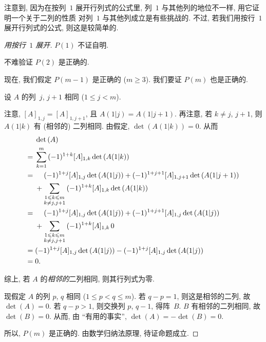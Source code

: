 注意到, 因为在按列~\(1\) 展开行列式的公式里,
列~\(1\) 与其他列的地位不一样,
用它证明一个关于二列的性质%
对列~\(1\) 与其他列成立是有些挑战的.
不过, 若我们用按行~\(1\) 展开行列式的公式,
则这是较简单的.

\begin{proof}[用按行~\(1\) 展开]
    \(P(1)\) 不证自明.

    不难验证 \(P(2)\) 是正确的.

    现在, 我们假定 \(P(m-1)\) 是正确的 (\(m \geq 3\)).
    我们要证 \(P(m)\) 也是正确的.

    设 \(A\) 的列~\(j\), \(j+1\) 相同 (\(1 \leq j < m\)).

    注意, \([A]_{1,j} = [A]_{1,j+1}\),
    且 \(A(1|j) = A(1|j+1)\).
    再注意, 若 \(k \neq j\), \(j+1\),
    则 \(A(1|k)\) 有 (相邻的) 二列相同.
    由假定, \(\det {(A(1|k))} = 0\).
    从而
    \begin{align*}
             & \det {(A)}
        \\
        = {} &
        \sum_{k = 1}^{m}
        {(-1)^{1 + k} [A]_{1,k} \det {(A(1|k))}}
        \\
        = {} &
        \hphantom{{} + {}}
        (-1)^{1 + j} [A]_{1,j} \det {(A(1|j))}
        + (-1)^{1 + j+1} [A]_{1,j+1} \det {(A(1|j+1))}
        \\
             & +
        \sum_{\substack{1 \leq k \leq m \\k \neq j, j+1}}
        {(-1)^{1 + k} [A]_{1,k} \det {(A(1|k))}}
        \\
        = {} &
        \hphantom{{} + {}}
        (-1)^{1 + j} [A]_{1,j} \det {(A(1|j))}
        + (-1)^{1 + j+1} [A]_{1,j} \det {(A(1|j))}
        \\
             & +
        \sum_{\substack{1 \leq k \leq m \\k \neq j, j+1}}
        {(-1)^{1 + k} [A]_{1,k}\,0 }
        \\
        = {} &
        (-1)^{1 + j} [A]_{1,j} \det {(A(1|j))}
        - (-1)^{1 + j} [A]_{1,j} \det {(A(1|j))}
        \\
        = {} & 0.
    \end{align*}

    综上,
    若 \(A\) 的\emph{相邻的}二列相同,
    则其行列式为零.

    现假定 \(A\) 的列 \(p\), \(q\) 相同
    (\(1 \leq p < q \leq m\)).
    若 \(q - p = 1\), 则这是相邻的二列,
    故 \(\det {(A)} = 0\).
    若 \(q - p > 1\), 则交换列 \(p\), \(q-1\),
    得阵~\(B\).
    \(B\) 有相邻的二列相同, 故 \(\det {(B)} = 0\).
    从而, 由 ``有用的事实'',
    \(\det {(A)} = -\det {(B)} = 0\).

    所以, \(P(m)\) 是正确的.
    由数学归纳法原理, 待证命题成立.
\end{proof}

